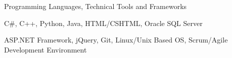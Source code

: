 \begin{cventries}
  \cventry
    {Programming Languages, Technical Tools and Frameworks}
    {}
    {}
    {}
    {
      \begin{cvitems}
        \item {C\#, C++, Python, Java, HTML/CSHTML, Oracle SQL Server}
        \item {ASP.NET Framework, jQuery, Git, Linux/Unix Based OS, Scrum/Agile Development Environment}
      \end{cvitems}
    }

\end{cventries}
